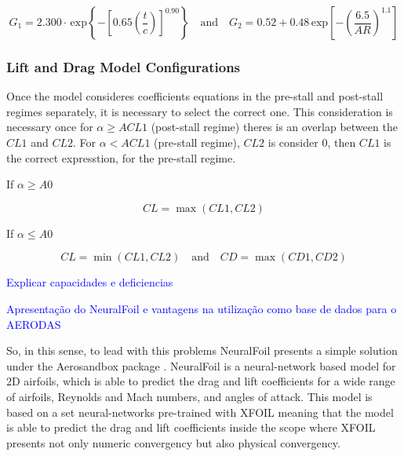 \begin{equation}
    G_1 = 2.300\cdot\,\mathrm{exp}\left\{-\left[0.65\left(\frac{t}{c}\right)\right]^{0.90}\right\} \quad \text{and} \quad G_2 = 0.52 + 0.48\,\mathrm{exp}\left[-\left(\frac{6.5}{A R}\right)^{1.1}\right]
\end{equation}



\subsubsection{Lift and Drag Model Configurations}

Once the model consideres coefficients equations in the pre-stall and post-stall regimes separately, it is necessary to select the correct one. This consideration is necessary once for $\alpha \geq ACL1$ (post-stall regime) theres is an overlap between the $CL1$ and $CL2$. For $\alpha < ACL1$ (pre-stall regime), $CL2$ is consider 0, then $CL1$ is the correct expresstion, for the pre-stall regime.

If $\alpha \geq A0$

\begin{equation}
    C L=\operatorname*{max}(CL1, CL2)
\end{equation}

If $\alpha \leq A0$

\begin{equation}
    CL = \operatorname*{min}(CL1 , CL2) \quad \text{and} \quad CD = \operatorname*{max}(CD1, CD2)
\end{equation}




\textcolor{blue}{Explicar capacidades e deficiencias} 

\textcolor{blue}{Apresentação do NeuralFoil e vantagens na utilização como base de dados para o AERODAS} 

So, in this sense, to lead with this problems NeuralFoil \cite{sharpe_neuralfoil_nodate} presents a simple solution under the Aerosandbox package \cite{sharpe_aerosandbox_nodate,sharpe_accelerating_nodate}. NeuralFoil is a neural-network based model for 2D airfoils, which is able to predict the drag and lift coefficients for a wide range of airfoils, Reynolds and Mach numbers, and angles of attack. This model is based on a set neural-networks pre-trained with XFOIL meaning that the model is able to predict the drag and lift coefficients inside the scope where XFOIL presents not only numeric convergency but also physical convergency. 

